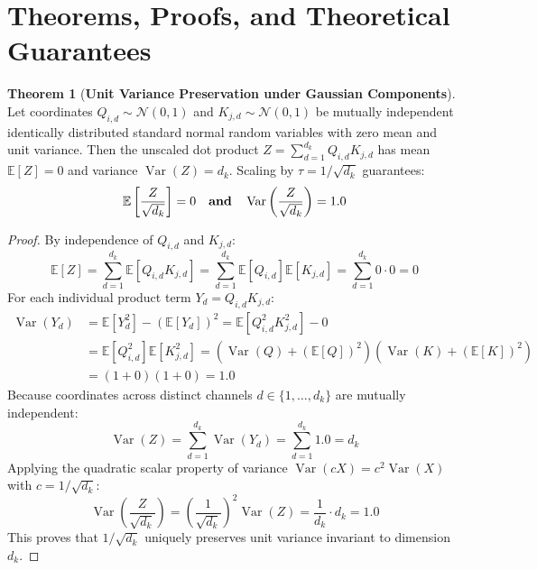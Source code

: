 \documentclass[11pt,a4paper]{article}
\theoremstyle{definition}
\newtheorem{theorem}{\textbf{Theorem}}[section]
\begin{document}
\section{Theorems, Proofs, and Theoretical Guarantees}

\begin{theorem}[\textbf{Unit Variance Preservation under Gaussian Components}]
Let coordinates $Q_{i, d} \sim \mathcal{N}(0, 1)$ and $K_{j, d} \sim \mathcal{N}(0, 1)$ be mutually independent identically distributed standard normal random variables with zero mean and unit variance.
Then the unscaled dot product $Z = \sum_{d=1}^{d_k} Q_{i, d} K_{j, d}$ has mean $\mathbb{E}[Z] = 0$ and variance $\operatorname{Var}(Z) = d_k$.
Scaling by $\tau = 1/\sqrt{d_k}$ guarantees:
{\boldmath
\begin{equation}
\mathbb{E}\left[\frac{Z}{\sqrt{d_k}}\right] = 0 \quad \text{\textbf{and}} \quad \operatorname{Var}\left(\frac{Z}{\sqrt{d_k}}\right) = 1.0
\end{equation}
}
\end{theorem}

\begin{proof}
By independence of $Q_{i, d}$ and $K_{j, d}$:
{\boldmath
\begin{equation}
\mathbb{E}[Z] = \sum_{d=1}^{d_k} \mathbb{E}[Q_{i, d} K_{j, d}] = \sum_{d=1}^{d_k} \mathbb{E}[Q_{i, d}]\mathbb{E}[K_{j, d}] = \sum_{d=1}^{d_k} 0 \cdot 0 = 0
\end{equation}
}
For each individual product term $Y_d = Q_{i, d} K_{j, d}$:
{\boldmath
\begin{align}
\operatorname{Var}(Y_d) &= \mathbb{E}[Y_d^2] - (\mathbb{E}[Y_d])^2 = \mathbb{E}[Q_{i, d}^2 K_{j, d}^2] - 0 \\
&= \mathbb{E}[Q_{i, d}^2] \mathbb{E}[K_{j, d}^2] = (\operatorname{Var}(Q) + (\mathbb{E}[Q])^2)(\operatorname{Var}(K) + (\mathbb{E}[K])^2) \\
&= (1 + 0)(1 + 0) = 1.0
\end{align}
}
Because coordinates across distinct channels $d \in \{1, \dots, d_k\}$ are mutually independent:
{\boldmath
\begin{equation}
\operatorname{Var}(Z) = \sum_{d=1}^{d_k} \operatorname{Var}(Y_d) = \sum_{d=1}^{d_k} 1.0 = d_k
\end{equation}
}
Applying the quadratic scalar property of variance $\operatorname{Var}(c X) = c^2 \operatorname{Var}(X)$ with $c = 1/\sqrt{d_k}$:
{\boldmath
\begin{equation}
\operatorname{Var}\left(\frac{Z}{\sqrt{d_k}}\right) = \left(\frac{1}{\sqrt{d_k}}\right)^2 \operatorname{Var}(Z) = \frac{1}{d_k} \cdot d_k = 1.0
\end{equation}
}
This proves that $1/\sqrt{d_k}$ uniquely preserves unit variance invariant to dimension $d_k$.
\end{proof}
\end{document}
